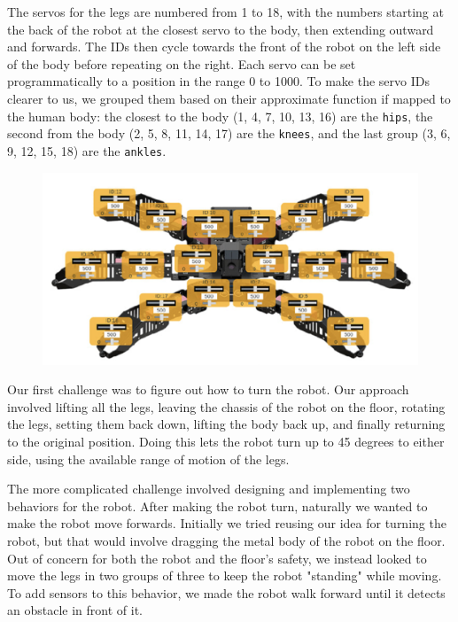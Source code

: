 \documentclass[11pt]{article}
\begin{document}
The servos for the legs are numbered from 1 to 18, with the numbers starting at the back of the robot at the closest servo to the body, then extending outward and forwards. The IDs then cycle towards the front of the robot on the left side of the body before repeating on the right. Each servo can be set programmatically to a position in the range 0 to 1000. To make the servo IDs clearer to us, we grouped them based on their approximate function if mapped to the human body: the closest to the body (1, 4, 7, 10, 13, 16) are the \lstinline{hips}, the second from the body (2, 5, 8, 11, 14, 17) are the \lstinline{knees}, and the last group (3, 6, 9, 12, 15, 18) are the \lstinline{ankles}.

\begin{figure}[h]
\includegraphics[width=160mm]{ids.png}
\centering
\end{figure}


Our first challenge was to figure out how to turn the robot. Our approach involved lifting all the legs, leaving the chassis of the robot on the floor, rotating the legs, setting them back down, lifting the body back up, and finally returning to the original position. Doing this lets the robot turn up to 45 degrees to either side, using the available range of motion of the legs. 

The more complicated challenge involved designing and implementing two behaviors for the robot. After making the robot turn, naturally we wanted to make the robot move forwards. Initially we tried reusing our idea for turning the robot, but that would involve dragging the metal body of the robot on the floor. Out of concern for both the robot and the floor's safety, we instead looked to move the legs in two groups of three to keep the robot "standing" while moving. To add sensors to this behavior, we made the robot walk forward until it detects an obstacle in front of it.
\end{document}
